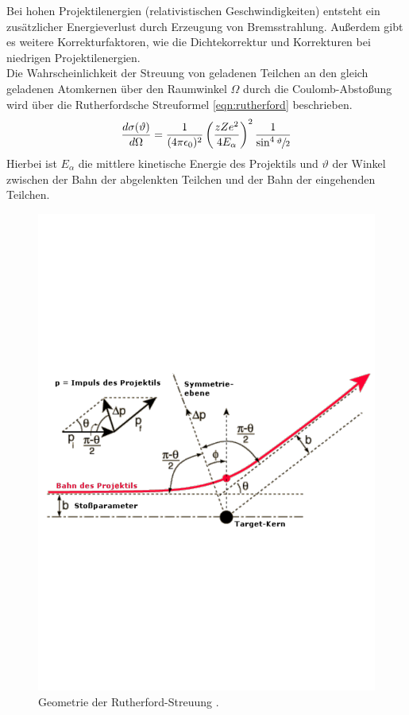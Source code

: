 Bei hohen Projektilenergien (relativistischen Geschwindigkeiten) entsteht ein zusätzlicher Energieverlust durch Erzeugung von Bremsstrahlung.
Außerdem gibt es weitere Korrekturfaktoren, wie die Dichtekorrektur und Korrekturen bei niedrigen Projektilenergien.
%
\\Die Wahrscheinlichkeit der Streuung von geladenen Teilchen an den gleich geladenen Atomkernen über den Raumwinkel $\Omega$ durch die Coulomb-Abstoßung wird über die Rutherfordsche Streuformel \eqref{eqn:rutherford} beschrieben.
\begin{equation}
	\frac{d \sigma(\vartheta)}{d \Omega} = \frac{1}{(4 \pi \epsilon_0)^2} \left( \frac{z Z e^2}{4 E_{\alpha}} \right)^2 \frac{1}{\sin^4{\sfrac{\vartheta}{2}}}
	\label{eqn:rutherford}
\end{equation}
Hierbei ist $E_{\alpha}$ die mittlere kinetische Energie des Projektils und $\vartheta$ der Winkel zwischen der Bahn der abgelenkten Teilchen und der Bahn der eingehenden Teilchen.
\begin{figure}[h!]
  \centering
  \includegraphics[width=\textwidth]{images/rutherford.pdf}
  \caption{Geometrie der Rutherford-Streuung \cite{wupp}.}
  \label{fig:rutherford}
\end{figure}
